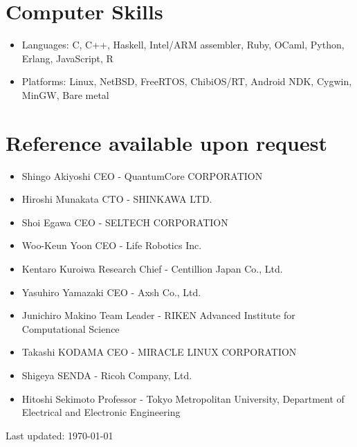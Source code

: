 \documentclass[letterpaper]{article}
\def\footer{
  \begin{center}
    \begin{footnotesize}
      Last updated: \today
    \end{footnotesize}
  \end{center}
}
\begin{document}
\section*{Computer Skills}

\begin{itemize}
  \item Languages: C, C++, Haskell, Intel/ARM assembler, Ruby, OCaml, Python, Erlang, JavaScript, R
  \item Platforms: Linux, NetBSD, FreeRTOS, ChibiOS/RT, Android NDK, Cygwin, MinGW, Bare metal
\end{itemize}

\section*{Reference available upon request}

\begin{itemize}
  \item Shingo Akiyoshi CEO - QuantumCore CORPORATION
  \item Hiroshi Munakata CTO - SHINKAWA LTD.
  \item Shoi Egawa CEO - SELTECH CORPORATION
  \item Woo-Keun Yoon CEO - Life Robotics Inc.
  \item Kentaro Kuroiwa Research Chief - Centillion Japan Co., Ltd.
  \item Yasuhiro Yamazaki CEO - Axsh Co., Ltd.
  \item Junichiro Makino Team Leader - RIKEN Advanced Institute for Computational Science
  \item Takashi KODAMA CEO - MIRACLE LINUX CORPORATION
  \item Shigeya SENDA - Ricoh Company, Ltd.
  \item Hitoshi Sekimoto Professor - Tokyo Metropolitan University, Department of Electrical and Electronic Engineering
\end{itemize}

\bigskip
\footer
\end{document}
